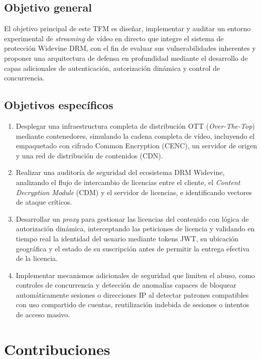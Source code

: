 \subsection{Objetivo general}

El objetivo principal de este TFM es diseñar, implementar y auditar un entorno experimental de \textit{streaming} de vídeo en directo que integre el sistema de protección Widevine DRM, con el fin de evaluar sus vulnerabilidades inherentes y proponer una arquitectura de defensa en profundidad mediante el desarrollo de capas adicionales de autenticación, autorización dinámica y control de concurrencia.

\subsection{Objetivos específicos}

\begin{enumerate}
    \item Desplegar una infraestructura completa de distribución OTT (\textit{Over-The-Top}) mediante contenedores, simulando la cadena completa de vídeo, incluyendo el empaquetado con cifrado Common Encryption (CENC), un servidor de origen y una red de distribución de contenidos (CDN).
    \item Realizar una auditoría de seguridad del ecosistema DRM Widevine, analizando el flujo de intercambio de licencias entre el cliente, el \textit{Content Decryption Module} (CDM) y el servidor de licencias, e identificando vectores de ataque críticos.
    \item Desarrollar un \textit{proxy} para gestionar las licencias del contenido con lógica de autorización dinámica, interceptando las peticiones de licencia y validando en tiempo real la identidad del usuario mediante tokens JWT, su ubicación geográfica y el estado de su suscripción antes de permitir la entrega efectiva de la licencia.
    \item Implementar mecanismos adicionales de seguridad que limiten el abuso, como controles de concurrencia y detección de anomalías capaces de bloquear automáticamente sesiones o direcciones IP al detectar patrones compatibles con uso compartido de cuentas, reutilización indebida de sesiones o intentos de acceso masivo.
\end{enumerate}

\section{Contribuciones}

